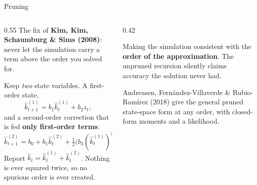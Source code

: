 \begin{frame}{Pruning}
\begin{columns}[T]
\begin{column}{0.55\textwidth}
\small
The fix of \textbf{Kim, Kim, Schaumburg \& Sims (2008)}: never let the simulation carry a term above the order you solved for.
\medskip

Keep \emph{two} state variables. A first-order state,
\[
  \hat{k}^{(1)}_{t+1}=b_1\hat{k}^{(1)}_t+b_2z_t ,
\]
and a second-order correction that is fed \textbf{only first-order terms}:
\[
  \hat{k}^{(2)}_{t+1}=b_0+b_1\hat{k}^{(2)}_t
  +\tfrac12\big(b_3(\hat{k}^{(1)}_t)^{2}+2b_4\hat{k}^{(1)}_tz_t+b_5z_t^{2}\big).
\]
Report $\hat{k}_t=\hat{k}^{(1)}_t+\hat{k}^{(2)}_t$. Nothing is ever squared twice, so no spurious order is ever created.
\end{column}
\begin{column}{0.42\textwidth}
\begin{conceptbox}[title=\textbf{What it is really doing}]\small
Making the simulation consistent with the \textbf{order of the approximation}. The unpruned recursion silently claims accuracy the solution never had.
\end{conceptbox}
\medskip
\begin{examplebox}\footnotesize
Andreasen, Fern\'andez-Villaverde \& Rubio-Ram\'irez (2018) give the general pruned state-space form at any order, with closed-form moments and a likelihood.
\end{examplebox}
\end{column}
\end{columns}
\end{frame}

